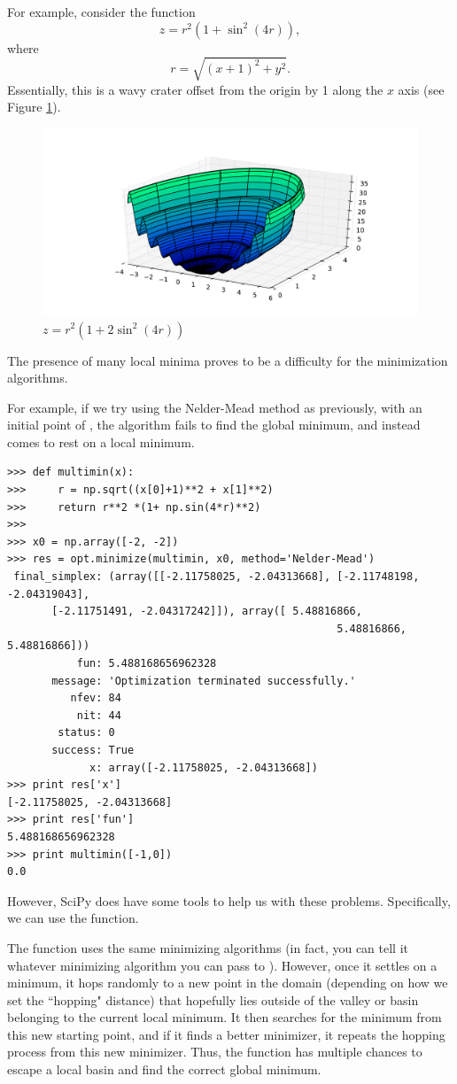 For example, consider the function
\[
z = r^2 (1+ \sin^2(4r)),
\]
where
\[
r = \sqrt{(x+1)^2 + y^2}.
\]
Essentially, this is a wavy crater offset from the origin by 1 along the $x$ axis (see Figure \ref{opt:multimin}).
\begin{figure}
\includegraphics[width=\textwidth]{ManyMinima.pdf}
\caption{$z = r^2 (1+ 2\sin^2(4r))$}
\label{opt:multimin}
\end{figure}
The presence of many local minima proves to be a difficulty for the minimization algorithms.

For example, if we try using the Nelder-Mead method as previously, with an initial point of , the algorithm fails to find the global minimum, and instead comes to rest on a local minimum.
\begin{lstlisting}
>>> def multimin(x):
>>>     r = np.sqrt((x[0]+1)**2 + x[1]**2)
>>>     return r**2 *(1+ np.sin(4*r)**2)
>>>
>>> x0 = np.array([-2, -2])
>>> res = opt.minimize(multimin, x0, method='Nelder-Mead')
 final_simplex: (array([[-2.11758025, -2.04313668], [-2.11748198, -2.04319043],
       [-2.11751491, -2.04317242]]), array([ 5.48816866,  
       												5.48816866,  5.48816866]))
           fun: 5.488168656962328
       message: 'Optimization terminated successfully.'
          nfev: 84
           nit: 44
        status: 0
       success: True
             x: array([-2.11758025, -2.04313668])
>>> print res['x']
[-2.11758025, -2.04313668]
>>> print res['fun']
5.488168656962328
>>> print multimin([-1,0])
0.0
\end{lstlisting}

However, SciPy does have some tools to help us with these problems. 
Specifically, we can use the  function.

The  function uses the same minimizing algorithms (in fact, you can tell it whatever minimizing algorithm you can pass to ).
However, once it settles on a minimum, it hops randomly to a new point in the domain (depending on how we set the ``hopping" distance) that hopefully lies outside of the valley
or basin belonging to the current local minimum.
It then searches for the minimum from this new starting point, and if it finds a better minimizer, it repeats the hopping process from this new minimizer. 
Thus, the  function has multiple chances to escape a local basin and find the correct global minimum. 

